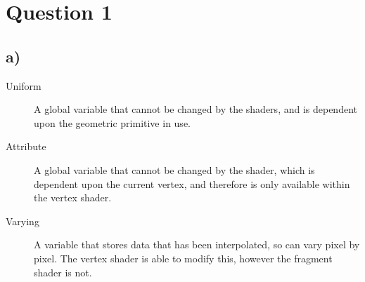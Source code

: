 \documentclass[a4paper,12pt]{article}
\begin{document}
\section*{Question 1}
\subsection*{a)}
\begin{description}
    \item[Uniform]
    A global variable that cannot be changed by the shaders, and is dependent upon the geometric primitive in use.
    \item[Attribute]
    A global variable that cannot be changed by the shader, which is dependent upon the current vertex, and therefore is only available within the vertex shader.
    \item[Varying]
    A variable that stores data that has been interpolated, so can vary pixel by pixel. The vertex shader is able to modify this, however the fragment shader is not.
\end{description}
\end{document}
